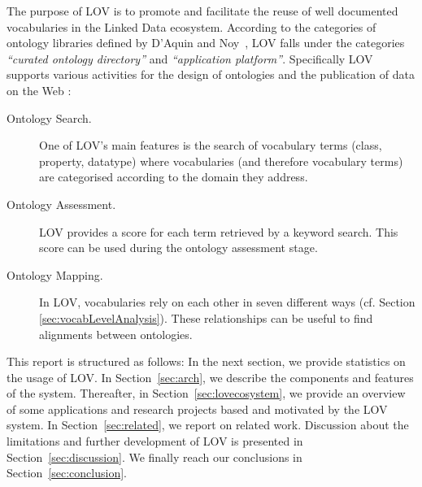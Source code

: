 \documentclass{iosart2c}
\begin{document}
The purpose of LOV is to promote and facilitate the reuse of well documented vocabularies in the Linked Data ecosystem. According to the categories of ontology libraries defined by D'Aquin and Noy~\cite{AquinJoWS12}, LOV falls under the categories \textit{``curated ontology directory''}  and \textit{``application platform''}.  Specifically LOV supports various activities for the design of ontologies and the publication of data on the Web \cite{MC10, ohdeploying, pedrinaci2014, villata2012}:

\begin{description}
 \item [Ontology Search.] One of LOV's main features is the search of vocabulary terms (class, property, datatype) where vocabularies (and therefore vocabulary terms) are categorised according to the domain they address.
 \item [Ontology Assessment.] LOV provides a score for each term retrieved by a keyword search. This score can be used during the ontology assessment stage.
 \item [Ontology Mapping.] In LOV, vocabularies rely on each other in seven different ways (cf. Section \ref{sec:vocabLevelAnalysis}). These relationships can be useful to find alignments between ontologies. 
\end{description}






This report is structured as follows: In the next section, we provide statistics on the usage of LOV. In Section~\ref{sec:arch}, we describe the components and features of the system. Thereafter,  in Section~\ref{sec:lovecosystem}, we provide an overview of some applications and research projects based and motivated by the LOV system. In Section~\ref{sec:related}, we report on related work. Discussion about the limitations and further development of LOV is presented in Section~\ref{sec:discussion}. We finally reach our conclusions in Section~\ref{sec:conclusion}.
\end{document}
